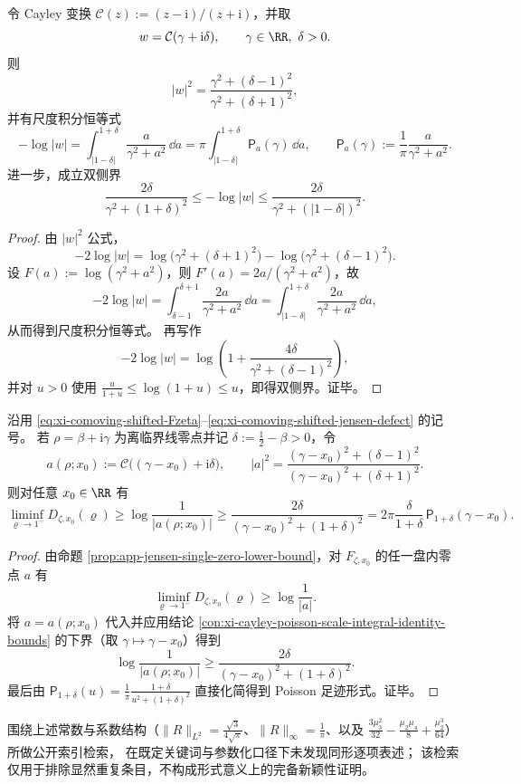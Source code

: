 \begin{conclusion}\label{con:xi-cayley-poisson-scale-integral-identity-bounds}
令 Cayley 变换 \(\mathcal C(z):=(z-\mathrm{i})/(z+\mathrm{i})\)，并取
\[
w=\mathcal C(\gamma+\mathrm{i}\delta),\qquad \gamma\in\RR,\ \delta>0.
\]
则
\[
|w|^2=\frac{\gamma^2+(\delta-1)^2}{\gamma^2+(\delta+1)^2},
\]
并有尺度积分恒等式
\[
-\log|w|
=\int_{|1-\delta|}^{1+\delta}\frac{a}{\gamma^2+a^2}\,\dd a
=\pi\int_{|1-\delta|}^{1+\delta}\mathsf P_a(\gamma)\,\dd a,
\qquad
\mathsf P_a(\gamma):=\frac1\pi\frac{a}{\gamma^2+a^2}.
\]
进一步，成立双侧界
\[
\frac{2\delta}{\gamma^2+(1+\delta)^2}
\le
-\log|w|
\le
\frac{2\delta}{\gamma^2+(|1-\delta|)^2}.
\]
\end{conclusion}
\begin{proof}
由 \(|w|^2\) 公式，
\[
-2\log|w|
=\log\!\bigl(\gamma^2+(\delta+1)^2\bigr)-\log\!\bigl(\gamma^2+(\delta-1)^2\bigr).
\]
设 \(F(a):=\log(\gamma^2+a^2)\)，则 \(F'(a)=2a/(\gamma^2+a^2)\)，故
\[
-2\log|w|
=\int_{\delta-1}^{\delta+1}\frac{2a}{\gamma^2+a^2}\,\dd a
=\int_{|1-\delta|}^{1+\delta}\frac{2a}{\gamma^2+a^2}\,\dd a,
\]
从而得到尺度积分恒等式。
再写作
\[
-2\log|w|
=\log\!\left(1+\frac{4\delta}{\gamma^2+(\delta-1)^2}\right),
\]
并对 \(u>0\) 使用
\(
\frac{u}{1+u}\le\log(1+u)\le u
\)，即得双侧界。证毕。
\end{proof}

\begin{conclusion}\label{con:xi-jensen-defect-poisson-footprint-lower-bound}
沿用 \eqref{eq:xi-comoving-shifted-Fzeta}--\eqref{eq:xi-comoving-shifted-jensen-defect} 的记号。
若 \(\rho=\beta+\mathrm{i}\gamma\) 为离临界线零点并记 \(\delta:=\frac12-\beta>0\)，令
\[
a(\rho;x_0):=\mathcal C\bigl((\gamma-x_0)+\mathrm{i}\delta\bigr),
\qquad
|a|^2=\frac{(\gamma-x_0)^2+(\delta-1)^2}{(\gamma-x_0)^2+(\delta+1)^2}.
\]
则对任意 \(x_0\in\RR\) 有
\[
\liminf_{\varrho\to1^-}D_{\zeta,x_0}(\varrho)
\ge
\log\frac{1}{|a(\rho;x_0)|}
\ge
\frac{2\delta}{(\gamma-x_0)^2+(1+\delta)^2}
=2\pi\frac{\delta}{1+\delta}\,\mathsf P_{1+\delta}(\gamma-x_0).
\]
\end{conclusion}
\begin{proof}
由命题 \ref{prop:app-jensen-single-zero-lower-bound}，对 \(F_{\zeta,x_0}\) 的任一盘内零点 \(a\) 有
\[
\liminf_{\varrho\to1^-}D_{\zeta,x_0}(\varrho)\ge \log\frac1{|a|}.
\]
将 \(a=a(\rho;x_0)\) 代入并应用结论
\ref{con:xi-cayley-poisson-scale-integral-identity-bounds}
的下界（取 \(\gamma\mapsto \gamma-x_0\)）得到
\[
\log\frac1{|a(\rho;x_0)|}
\ge \frac{2\delta}{(\gamma-x_0)^2+(1+\delta)^2}.
\]
最后由
\(
\mathsf P_{1+\delta}(u)=\frac1\pi\frac{1+\delta}{u^2+(1+\delta)^2}
\)
直接化简得到 Poisson 足迹形式。证毕。
\end{proof}

\begin{remark}[同形检索的范围说明]\label{rem:xi-poisson-cauchy-cayley-jensen-public-index-scope}
围绕上述常数与系数结构（\(\|R\|_{L^2}=\frac{\sqrt3}{4\sqrt\pi}\)、\(\|R\|_\infty=\frac1\pi\)、以及
\(\frac{3\mu_3^2}{32}-\frac{\mu_2\mu_4}{8}+\frac{\mu_2^3}{64}\)）所做公开索引检索，
在既定关键词与参数化口径下未发现同形逐项表述；
该检索仅用于排除显然重复条目，不构成形式意义上的完备新颖性证明。
\end{remark}

